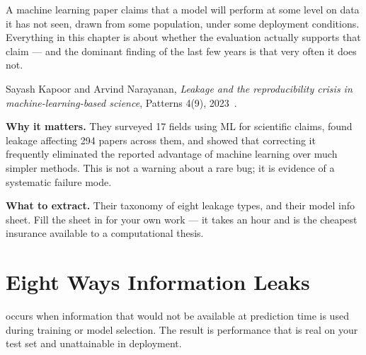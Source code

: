 A machine learning paper claims that a model will perform at some level on data
it has not seen, drawn from some population, under some deployment conditions.
Everything in this chapter is about whether the evaluation actually supports
that claim --- and the dominant finding of the last few years is that very
often it does not.

\begin{paperbox}
Sayash Kapoor and Arvind Narayanan, \emph{Leakage and the reproducibility
crisis in machine-learning-based science}, Patterns 4(9),
2023~\cite{kapoor2023leakage}.\oa{}

\medskip
\textbf{Why it matters.} They surveyed 17 fields using ML for scientific
claims, found leakage affecting 294 papers across them, and showed that
correcting it frequently eliminated the reported advantage of machine learning
over much simpler methods. This is not a warning about a rare bug; it is
evidence of a systematic failure mode.

\medskip
\textbf{What to extract.} Their taxonomy of eight leakage types, and their
model info sheet. Fill the sheet in for your own work --- it takes an hour and
is the cheapest insurance available to a computational thesis.
\end{paperbox}

\section{Eight Ways Information Leaks}

\begin{definitionbox}
 occurs when information that would not be available at
prediction time is used during training or model selection. The result is
performance that is real on your test set and unattainable in deployment.
\end{definitionbox}

